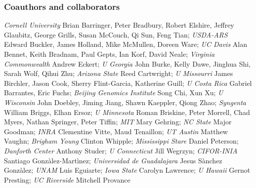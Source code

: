 \documentclass[11pt]{article}
\begin{document}
\subsubsection*{Coauthors and collaborators}
\begin{small}
\emph{Cornell University} Brian Barringer, Peter Bradbury, Robert Elshire, Jeffrey Glaubitz, George Grills, Susan McCouch, Qi Sun, Feng Tian;
\emph{USDA-ARS} Edward Buckler, James Holland, Mike McMullen, Doreen Ware;
\emph{UC Davis} Alan Bennet, Keith Bradnam, Paul Gepts, Ian Korf, David Neale;
\emph{Virginia Commonwealth} Andrew Eckert;
\emph{U Georgia} John Burke, Kelly Dawe, Jinghua Shi, Sarah Wolf, Qihui Zhu;
\emph{Arizona State} Reed Cartwright;
\emph{U Missourri} James Birchler, Jason Cook, Sherry Flint-Garcia, Katherine Guill;
\emph{U Costa Rica} Gabriel Barrantes, Eric Fuchs;
\emph{ Beijing Genomics Institute} Song Chi, Xun Xu;
\emph{U Wisconsin} John Doebley, Jiming Jiang, Shawn Kaeppler, Qiong Zhao;
\emph{Syngenta} William Briggs, Elhan Ersoz;
\emph{U Minnesota} Roman Briskine, Peter Morrell, Chad Myers, Nathan Springer, Peter Tiffin;
\emph{MIT} Mary Gehring; 
\emph{NC State} Major Goodman; 
\emph{INRA} Clementine Vitte, Maud Tenaillon; 
\emph{UT Austin} Matthew Vaughn; 
\emph{Brigham Young} Clinton Whipple; 
\emph{Mississippi Stare} Daniel Peterson; 
\emph{Danforth Center} Anthony Studer; 
\emph{U Connecticut} Jill Wegrzyn; 
\emph{CIFOR-INIA} Santiago Gonz\`alez-Mart\`inez; 
\emph{Universidad de Guadalajara} Jesus S\`anchez Gonz\`alez; 
\emph{UNAM} Luis Eguiarte; 
\emph{Iowa State} Carolyn Lawrence; 
\emph{U Hawaii} Gernot Presting; 
\emph{UC Riverside} Mitchell Provance \\ 
\end{small}
\end{document}
